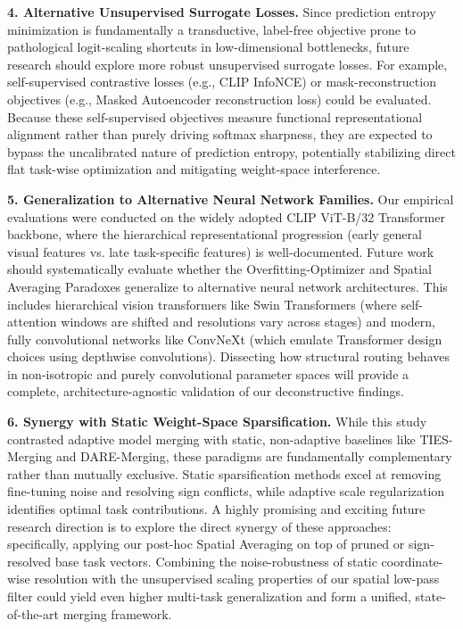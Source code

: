 \textbf{4. Alternative Unsupervised Surrogate Losses.}
Since prediction entropy minimization is fundamentally a transductive, label-free objective prone to pathological logit-scaling shortcuts in low-dimensional bottlenecks, future research should explore more robust unsupervised surrogate losses. For example, self-supervised contrastive losses (e.g., CLIP InfoNCE) or mask-reconstruction objectives (e.g., Masked Autoencoder reconstruction loss) could be evaluated. Because these self-supervised objectives measure functional representational alignment rather than purely driving softmax sharpness, they are expected to bypass the uncalibrated nature of prediction entropy, potentially stabilizing direct flat task-wise optimization and mitigating weight-space interference.

\textbf{5. Generalization to Alternative Neural Network Families.}
Our empirical evaluations were conducted on the widely adopted CLIP ViT-B/32 Transformer backbone, where the hierarchical representational progression (early general visual features vs. late task-specific features) is well-documented. Future work should systematically evaluate whether the Overfitting-Optimizer and Spatial Averaging Paradoxes generalize to alternative neural network architectures. This includes hierarchical vision transformers like Swin Transformers \cite{swin} (where self-attention windows are shifted and resolutions vary across stages) and modern, fully convolutional networks like ConvNeXt \cite{convnext} (which emulate Transformer design choices using depthwise convolutions). Dissecting how structural routing behaves in non-isotropic and purely convolutional parameter spaces will provide a complete, architecture-agnostic validation of our deconstructive findings.

\textbf{6. Synergy with Static Weight-Space Sparsification.}
While this study contrasted adaptive model merging with static, non-adaptive baselines like TIES-Merging and DARE-Merging, these paradigms are fundamentally complementary rather than mutually exclusive. Static sparsification methods excel at removing fine-tuning noise and resolving sign conflicts, while adaptive scale regularization identifies optimal task contributions. A highly promising and exciting future research direction is to explore the direct synergy of these approaches: specifically, applying our post-hoc Spatial Averaging on top of pruned or sign-resolved base task vectors. Combining the noise-robustness of static coordinate-wise resolution with the unsupervised scaling properties of our spatial low-pass filter could yield even higher multi-task generalization and form a unified, state-of-the-art merging framework.
